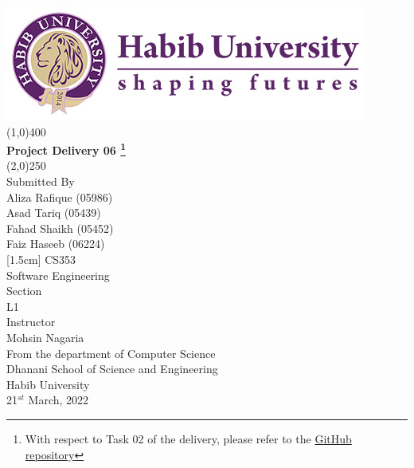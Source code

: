 \begin{titlepage}
\thispagestyle{empty}
\begin{center}
\includegraphics[scale=0.40]{Figures/HU-LOGO--01.jpg}
\line(1,0){400}\\
[2mm]
\selectfont
\textbf{Project Delivery 06 \footnote{With respect to Task 02 of the delivery, please refer to the \href{https://github.com/Asad-Tariq/Meri_Raye.git}{GitHub repository}}}\\
\line(2,0){250}\\
[0.5cm]
Submitted By\\
Aliza Rafique (05986)\\
Asad Tariq (05439)\\
Fahad Shaikh (05452)\\
Faiz Haseeb (06224)\\
[1.5cm]
CS353\\
Software Engineering\\ 
[1.0cm]
Section\\
L1\\
[1.0cm]
Instructor\\
Mohsin Nagaria\\
[1.0cm]
From the department of Computer Science\\
Dhanani School of Science and Engineering\\
Habib University\\
21$^{st}$ March, 2022
\end{center} 
\end{titlepage}